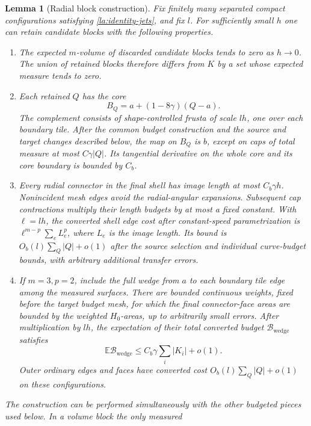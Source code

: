 \documentclass[11pt]{article}
\numberwithin{equation}{section}
\newtheorem{lemma}[theorem]{Lemma}
\theoremstyle{definition}
\theoremstyle{remark}
\begin{document}
\begin{lemma}[Radial block construction]\label{la:radial-blocks}
Fix finitely many separated compact configurations satisfying
\eqref{la:identity-jets}, and fix $l$.  For sufficiently small $h$ one
can retain candidate blocks with the following properties.

\begin{enumerate}
\item The expected $m$-volume of discarded candidate blocks tends to
zero as $h\to0$.  The union of retained blocks therefore differs
from $K$ by a set whose expected measure tends to zero.
\item Each retained $Q$ has the core
\[
 B_Q=a+(1-8\gamma)(Q-a).
\]
The complement consists of shape-controlled frusta of scale $lh$, one
over each boundary tile.  After the common budget construction and
the source and target changes described below, the map on $B_Q$ is
$b$, except on caps of total measure at most $C\gamma |Q|$.  Its
tangential derivative on the whole core and its core boundary is
bounded by $C_b$.
\item Every radial connector in the final shell has image length at
most $C_b\gamma h$.  Nonincident mesh edges avoid the radial-angular
expansions.  Subsequent cap contractions multiply their length
budgets by at most a fixed constant.  With $\ell=lh$, the converted
shell edge cost after constant-speed parametrization is
$\ell^{m-p}\sum_e L_e^p$, where $L_e$ is the image length.
Its bound is $O_b(l)\sum_Q|Q|+o(1)$ after the source selection and
individual curve-budget bounds, with arbitrary additional transfer
errors.
\item If $m=3,p=2$, include the full wedge from $a$ to each boundary
tile edge among the measured surfaces.  There are bounded continuous
weights, fixed before the target budget mesh, for which the final
connector-face areas are bounded by the weighted $H_0$-areas, up to
arbitrarily small errors.  After multiplication by $lh$, the expectation of their total converted budget
$\mathcal B_{\mathrm{wedge}}$ satisfies
\begin{equation}\label{la:wedge-cost}
 \mathbb E\mathcal B_{\mathrm{wedge}}
       \le C_b\gamma\sum_i |K_i|+o(1).
\end{equation}
Outer ordinary edges and faces have converted cost
$O_b(l)\sum_Q|Q|+o(1)$ on these configurations.
\end{enumerate}
The construction can be performed simultaneously with the other
budgeted pieces used below.  In a volume block the only measured

\end{lemma}
\end{document}
